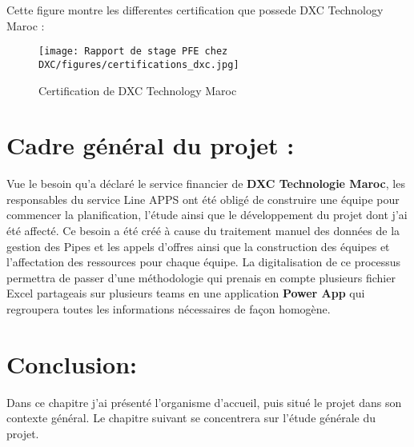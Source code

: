 Cette figure montre les differentes certification que possede DXC Technology Maroc : 

\begin{figure}[!h]
    \centering
    \texttt{[image: Rapport de stage PFE chez DXC/figures/certifications\_dxc.jpg]}
    \caption{Certification de DXC Technology Maroc}
\end{figure}

\section{Cadre général du projet :}
Vue le besoin qu’a déclaré le service financier de \textbf{DXC Technologie Maroc}, les responsables du service Line APPS ont été obligé de construire une équipe pour commencer la planification, l’étude ainsi que le développement du projet dont j’ai été affecté. Ce besoin a été créé à cause du traitement manuel des données de la gestion des Pipes et les appels d’offres ainsi que la construction des équipes et l’affectation des ressources pour chaque équipe. La digitalisation de ce processus permettra de passer d'une méthodologie qui prenais en compte plusieurs fichier Excel partageais sur plusieurs teams en une application \textbf{Power App} qui regroupera toutes les informations nécessaires de façon homogène.


\section{Conclusion:}
Dans ce chapitre j’ai présenté l’organisme d’accueil, puis situé le projet dans son contexte général. Le chapitre suivant se concentrera sur l’étude générale du projet.

